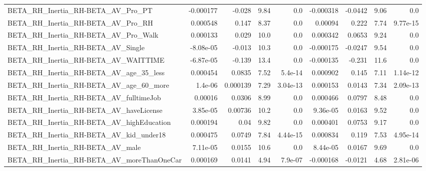 \begin{tabular}{lrrrrrrrr}
BETA\_RH\_Inertia\_RH-BETA\_AV\_Pro\_PT                  &   -0.000177 &       -0.028 &     9.84 &      0.0 &  -0.000318 &     -0.0442 &         9.06 &           0.0 \\
BETA\_RH\_Inertia\_RH-BETA\_AV\_Pro\_RH                  &    0.000548 &        0.147 &     8.37 &      0.0 &    0.00094 &       0.222 &         7.74 &      9.77e-15 \\
BETA\_RH\_Inertia\_RH-BETA\_AV\_Pro\_Walk                &    0.000133 &        0.029 &     10.0 &      0.0 &   0.000342 &      0.0653 &         9.24 &           0.0 \\
BETA\_RH\_Inertia\_RH-BETA\_AV\_Single                  &   -8.08e-05 &       -0.013 &     10.3 &      0.0 &  -0.000175 &     -0.0247 &         9.54 &           0.0 \\
BETA\_RH\_Inertia\_RH-BETA\_AV\_WAITTIME                &   -6.87e-05 &       -0.139 &     13.4 &      0.0 &  -0.000135 &      -0.231 &         11.6 &           0.0 \\
BETA\_RH\_Inertia\_RH-BETA\_AV\_age\_35\_less             &    0.000454 &       0.0835 &     7.52 &  5.4e-14 &   0.000902 &       0.145 &         7.11 &      1.14e-12 \\
BETA\_RH\_Inertia\_RH-BETA\_AV\_age\_60\_more             &     1.4e-06 &     0.000139 &     7.29 & 3.04e-13 &   0.000153 &      0.0143 &         7.34 &      2.09e-13 \\
BETA\_RH\_Inertia\_RH-BETA\_AV\_fulltimeJob             &     0.00016 &       0.0306 &     8.99 &      0.0 &   0.000466 &      0.0797 &         8.48 &           0.0 \\
BETA\_RH\_Inertia\_RH-BETA\_AV\_haveLicense             &    3.85e-05 &      0.00736 &     10.2 &      0.0 &   9.36e-05 &      0.0163 &         9.52 &           0.0 \\
BETA\_RH\_Inertia\_RH-BETA\_AV\_highEducation           &    0.000194 &         0.04 &     9.82 &      0.0 &   0.000401 &      0.0753 &         9.17 &           0.0 \\
BETA\_RH\_Inertia\_RH-BETA\_AV\_kid\_under18             &    0.000475 &       0.0749 &     7.84 & 4.44e-15 &   0.000834 &       0.119 &         7.53 &      4.95e-14 \\
BETA\_RH\_Inertia\_RH-BETA\_AV\_male                    &    7.11e-05 &       0.0155 &     10.6 &      0.0 &   8.44e-05 &      0.0167 &         9.69 &           0.0 \\
BETA\_RH\_Inertia\_RH-BETA\_AV\_moreThanOneCar          &    0.000169 &       0.0141 &     4.94 &  7.9e-07 &  -0.000168 &     -0.0121 &         4.68 &      2.81e-06 \\

\end{tabular}
